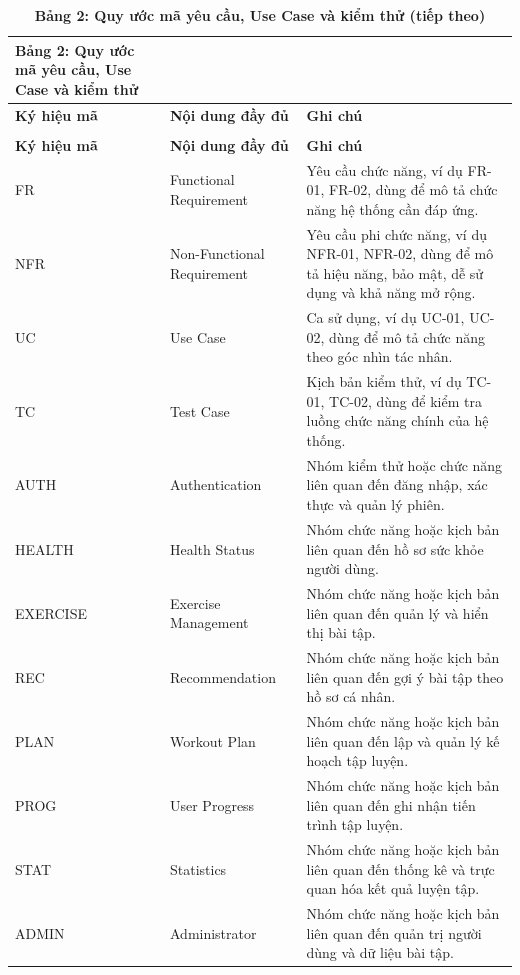\begin{longtable}{|P{0.19\textwidth}|P{0.34\textwidth}|P{0.39\textwidth}|}
\caption*{\textbf{Bảng 2: Quy ước mã yêu cầu, Use Case và kiểm thử}}\\
\hline
\textbf{Ký hiệu mã} & \textbf{Nội dung đầy đủ} & \textbf{Ghi chú} \\
\hline
\endfirsthead
\caption*{\textbf{Bảng 2: Quy ước mã yêu cầu, Use Case và kiểm thử (tiếp theo)}}\\
\hline
\textbf{Ký hiệu mã} & \textbf{Nội dung đầy đủ} & \textbf{Ghi chú} \\
\hline
\endhead
FR & Functional Requirement & Yêu cầu chức năng, ví dụ FR-01, FR-02, dùng để mô tả chức năng hệ thống cần đáp ứng. \\
\hline
NFR & Non-Functional Requirement & Yêu cầu phi chức năng, ví dụ NFR-01, NFR-02, dùng để mô tả hiệu năng, bảo mật, dễ sử dụng và khả năng mở rộng. \\
\hline
UC & Use Case & Ca sử dụng, ví dụ UC-01, UC-02, dùng để mô tả chức năng theo góc nhìn tác nhân. \\
\hline
TC & Test Case & Kịch bản kiểm thử, ví dụ TC-01, TC-02, dùng để kiểm tra luồng chức năng chính của hệ thống. \\
\hline
AUTH & Authentication & Nhóm kiểm thử hoặc chức năng liên quan đến đăng nhập, xác thực và quản lý phiên. \\
\hline
HEALTH & Health Status & Nhóm chức năng hoặc kịch bản liên quan đến hồ sơ sức khỏe người dùng. \\
\hline
EXERCISE & Exercise Management & Nhóm chức năng hoặc kịch bản liên quan đến quản lý và hiển thị bài tập. \\
\hline
REC & Recommendation & Nhóm chức năng hoặc kịch bản liên quan đến gợi ý bài tập theo hồ sơ cá nhân. \\
\hline
PLAN & Workout Plan & Nhóm chức năng hoặc kịch bản liên quan đến lập và quản lý kế hoạch tập luyện. \\
\hline
PROG & User Progress & Nhóm chức năng hoặc kịch bản liên quan đến ghi nhận tiến trình tập luyện. \\
\hline
STAT & Statistics & Nhóm chức năng hoặc kịch bản liên quan đến thống kê và trực quan hóa kết quả luyện tập. \\
\hline
ADMIN & Administrator & Nhóm chức năng hoặc kịch bản liên quan đến quản trị người dùng và dữ liệu bài tập. \\
\hline
\end{longtable}
